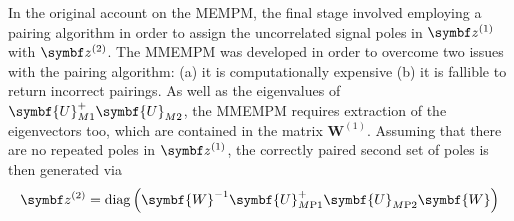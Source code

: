 {In the original account on the \ac{MEMPM}, the final stage involved employing a
pairing algorithm in order to assign the uncorrelated signal poles in $\bdzone$
with $\bdztwo$\cite{Hua1992}. The \ac{MMEMPM} was developed in order to
overcome two issues with the pairing algorithm: (a) it is computationally
expensive (b) it is fallible to return incorrect pairings\cite{Chen2007}.
As well as the eigenvalues of $\symbf{U}^{+}_{M1}\symbf{U}_{M2}^{\vphantom{+}}$,
the \ac{MMEMPM} requires extraction of the eigenvectors too, which are
contained in the matrix $\symbf{W}^{(1)}$. Assuming that there are no repeated
poles in $\bdzone$, the correctly paired second set of poles is then generated
via
\begin{equation}
    \bdztwo = \diag\left(
        \symbf{W}^{-1}
        \symbf{U}_{M\text{P}1}^+
        \symbf{U}_{M\text{P}2}^{\vphantom{+}}
        \symbf{W}
    \right)
\end{equation}

}
